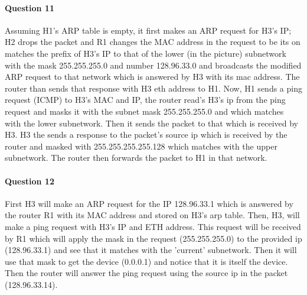 \documentclass[12pt]{article}
\begin{document}
\pagebreak

\paragraph*{Question 11}
Assuming H1's ARP table is empty, it first makes an ARP request for H3's IP; H2 drops the packet
and R1 changes the MAC address in the request to be its on matches the prefix of H3's IP to that
of the lower (in the picture) subnetwork with the mask 255.255.255.0 and number 128.96.33.0 and
broadcasts the modified ARP request to that network which is answered by H3 with its mac address.
The router than sends that response with H3 eth address to H1. Now, H1 sends a ping request (ICMP)
to H3's MAC and IP, the router read's H3's ip from the ping request and masks it
with the subnet mask 255.255.255.0 and which matches with the lower subnetwork. Then it sends the
packet to that which is received by H3. H3 the sends a response to the packet's source ip which
is received by the router and masked with 255.255.255.255.128 which matches with the upper subnetwork.
The router then forwards the packet to H1 in that network.

\paragraph*{Question 12}
First H3 will make an ARP request for the IP 128.96.33.1 which is answered by the router R1 with its
MAC address and stored on H3's arp table. Then, H3, will make a ping request with H3's IP and ETH
address. This request will be received by R1 which will apply the mask in the request (255.255.255.0)
to the provided ip (128.96.33.1) and see that it matches with the 'current' subnetwork. Then it will
use that mask to get the device (0.0.0.1) and notice that it is itself the device. Then the router
will answer the ping request using the source ip in the packet (128.96.33.14).
\end{document}

